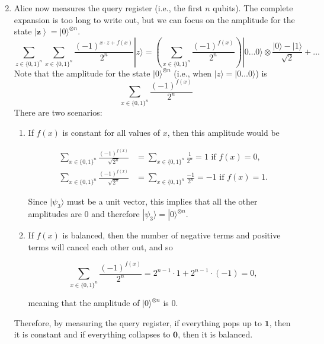 \documentclass{article}
\newcommand{\ket}[1]{\ensuremath{\left|#1\right\rangle}}
\begin{document}
\begin{theorem}
\begin{enumerate}
\begin{equation}
          \end{equation}
        \item Alice now measures the query register (i.e., the first $n$ qubits). The complete expansion is too long to write out, but we can focus on the amplitude for the state $\ket{\mathbf{z}} = |0\rangle^{\otimes n}$. 
          \begin{equation} 
            \sum_{z \in \{0, 1\}^n} \sum_{x \in \{0, 1\}^n} \frac{(-1)^{x \cdot z + f(x)}}{2^n} |z\rangle = \left( \sum_{x \in \{0, 1\}^n} \frac{(-1)^{f(x)}}{2^n}\right) |0\ldots 0 \rangle \otimes \frac{|0\rangle - |1\rangle}{\sqrt{2}} + \ldots
          \end{equation}
          Note that the amplitude for the state $|0\rangle^{\otimes n}$ (i.e., when $|z\rangle = |0 \ldots 0\rangle$) is 
          \begin{equation} 
            \sum_{x \in \{0, 1\}^n} \frac{(-1)^{f(x)}}{2^n}
          \end{equation}
          There are two scenarios: 
          \begin{enumerate}
            \item If $f(x)$ is constant for all values of $x$, then this amplitude would be 

            \begin{align*} 
              \sum_{x \in \{0, 1\}^n} \frac{(-1)^{f(x)}}{\sqrt{2^n}} & = \sum_{x \in \{0, 1\}^n} \frac{1}{2^n} = 1 \text{ if } f(x) = 0, \\
              \sum_{x \in \{0, 1\}^n} \frac{(-1)^{f(x)}}{\sqrt{2^n}} & = \sum_{x \in \{0, 1\}^n} \frac{-1}{2^n} = -1 \text{ if } f(x) = 1.
            \end{align*}

            Since $|\psi_3 \rangle$ must be a unit vector, this implies that all the other amplitudes are $0$ and therefore $|\psi_3 \rangle = |0\rangle^{\otimes n}$. 

            \item If $f(x)$ is balanced, then the number of negative terms and positive terms will cancel each other out, and so 

              \[\sum_{x \in \{0, 1\}^n} \frac{(-1)^{f(x)}}{2^n} = 2^{n-1} \cdot 1 + 2^{n-1} \cdot (-1) = 0,\]

            meaning that the amplitude of $|0\rangle^{\otimes n}$ is $0$. 
          \end{enumerate}
          Therefore, by measuring the query register, if everything pops up to $\mathbf{1}$, then it is constant and if everything collapses to $\mathbf{0}$, then it is balanced. 
      \end{enumerate}
    \end{theorem}
\end{document}

